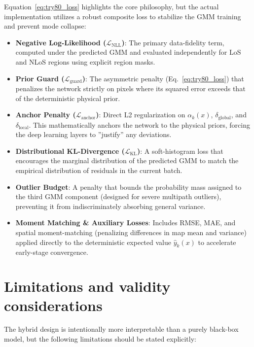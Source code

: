 \documentclass[11pt,a4paper]{article}
\begin{document}
Equation~\ref{eq:try80_loss} highlights the core philosophy, but the actual implementation utilizes a robust composite loss to stabilize the GMM training and prevent mode collapse:

\begin{itemize}
\item \textbf{Negative Log-Likelihood ($\mathcal{L}_{\mathrm{NLL}}$)}: The primary data-fidelity term, computed under the predicted GMM and evaluated independently for LoS and NLoS regions using explicit region masks.
\item \textbf{Prior Guard ($\mathcal{L}_{\mathrm{guard}}$)}: The asymmetric penalty (Eq.~\ref{eq:try80_loss}) that penalizes the network strictly on pixels where its squared error exceeds that of the deterministic physical prior.
\item \textbf{Anchor Penalty ($\mathcal{L}_{\mathrm{anchor}}$)}: Direct L2 regularization on $\alpha_k(x)$, $\delta_{\mathrm{global}}$, and $\delta_{\mathrm{local}}$. This mathematically anchors the network to the physical priors, forcing the deep learning layers to ''justify'' any deviations.
\item \textbf{Distributional KL-Divergence ($\mathcal{L}_{\mathrm{KL}}$)}: A soft-histogram loss that encourages the marginal distribution of the predicted GMM to match the empirical distribution of residuals in the current batch.
\item \textbf{Outlier Budget}: A penalty that bounds the probability mass assigned to the third GMM component (designed for severe multipath outliers), preventing it from indiscriminately absorbing general variance.
\item \textbf{Moment Matching \& Auxiliary Losses}: Includes RMSE, MAE, and spatial moment-matching (penalizing differences in map mean and variance) applied directly to the deterministic expected value $\hat y_k(x)$ to accelerate early-stage convergence.
\end{itemize}

\section{Limitations and validity considerations}

The hybrid design is intentionally more interpretable than a purely black-box
model, but the following limitations should be stated explicitly:
\end{document}
